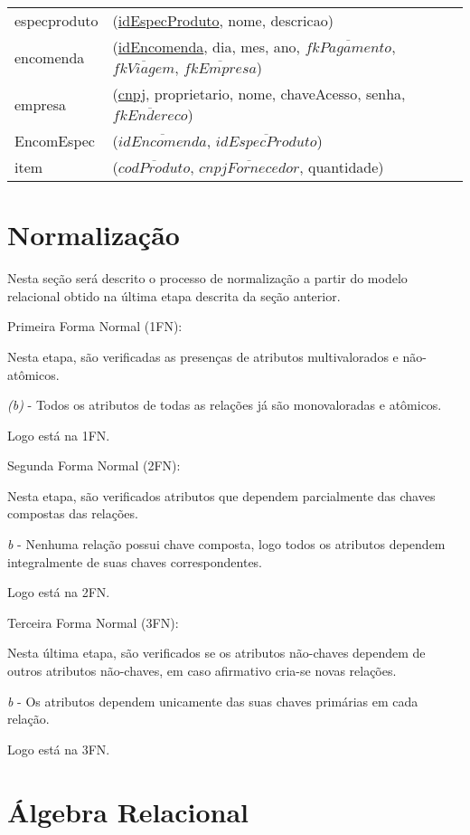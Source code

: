 \documentclass[12pt, onecolumn, titlepage]{article}
\begin{document}
\begin{table}[htb!]
\begin{center}
\begin{tabular}{p{2.5cm} p{10.5cm}}
especproduto & (\underline{idEspecProduto}, nome, descricao)\\
encomenda & (\underline{idEncomenda}, dia, mes, ano, $\overline{fkPagamento}$, $\overline{fkViagem}$, $\overline{fkEmpresa}$)\\
empresa & (\underline{cnpj}, proprietario, nome, chaveAcesso, senha, $\overline{fkEndereco}$)\\
EncomEspec & (\underline{$\overline{idEncomenda}$}, \underline{$\overline{idEspecProduto}$})\\
item & (\underline{$\overline{codProduto}$}, \underline{$\overline{cnpjFornecedor}$}, quantidade)
\end{tabular}
\end{center}
\end{table}

\newpage
\section{Normalização}
Nesta seção será descrito o processo de normalização a partir do modelo relacional obtido na última etapa descrita da seção anterior.

\begin{description}

\item Primeira Forma Normal (1FN):

Nesta etapa, são verificadas as presenças de atributos multivalorados e não-atômicos.

\textit{(b)} - Todos os atributos de todas as relações já são monovaloradas e atômicos.

Logo está na 1FN.

\item Segunda Forma Normal (2FN):

Nesta etapa, são verificados atributos que dependem parcialmente das chaves compostas das relações.

\textit{b} - Nenhuma relação possui chave composta, logo todos os atributos dependem integralmente de suas chaves correspondentes.

Logo está na 2FN.

\item Terceira Forma Normal (3FN):

Nesta última etapa, são verificados se os atributos não-chaves dependem de outros atributos não-chaves, em caso afirmativo cria-se novas relações.

\textit{b} - Os atributos dependem unicamente das suas chaves primárias em cada relação.

Logo está na 3FN.
\end{description}


\section{Álgebra Relacional}
\label{sect:algebra}
\end{document}
